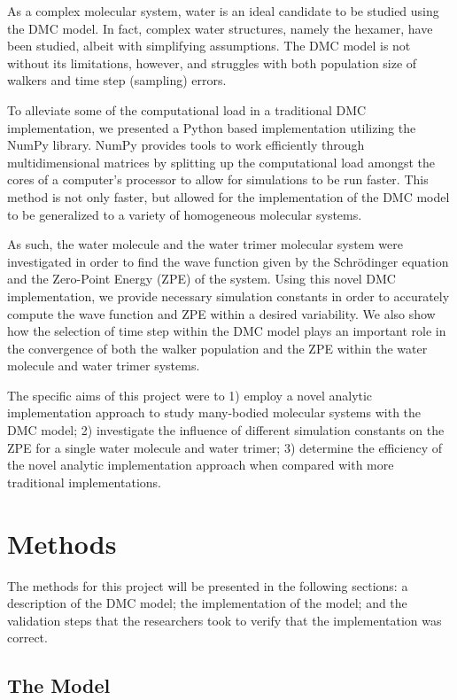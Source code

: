 \documentclass[journal=jacsat,manuscript=article]{achemso}
\begin{document}
As a complex molecular system, water is an ideal candidate to be studied using the DMC model\cite{Reynolds1982}. In fact, complex water structures, namely the hexamer, have been studied\cite{Babin2013,Severson1999}, albeit with simplifying assumptions. The DMC model is not without its limitations, however, and struggles with both population size of walkers\cite{Mallory2015} and time step\cite{Urimgar1993} (sampling) errors. 

To alleviate some of the computational load in a traditional DMC implementation, we presented a Python based implementation utilizing the NumPy library. NumPy provides tools to work efficiently through multidimensional matrices by splitting up the computational load amongst the cores of a computer’s processor to allow for simulations to be run faster. This method is not only faster, but allowed for the implementation of the DMC model to be generalized to a variety of homogeneous molecular systems. 

As such, the water molecule and the water trimer molecular system were investigated in order to find the wave function given by the Schr\"odinger equation and the Zero-Point Energy\cite{Gregory1996} (ZPE) of the system. Using this novel DMC implementation, we provide necessary simulation constants in order to accurately compute the wave function and ZPE within a desired variability. We also show how the selection of time step within the DMC model plays an important role in the convergence of both the walker population and the ZPE within the water molecule and water trimer systems. 
	
The specific aims of this project were to 1) employ a novel analytic implementation approach to study many-bodied molecular systems with the DMC model; 2) investigate the influence of different simulation constants on the ZPE for a single water molecule and water trimer; 3) determine the efficiency of the novel analytic implementation approach when compared with more traditional implementations. 


\section{Methods}

The methods for this project will be presented in the following sections: a description of the DMC model; the implementation of the model; and the validation steps that the researchers took to verify that the implementation was correct. 

\subsection{The Model}
\end{document}
